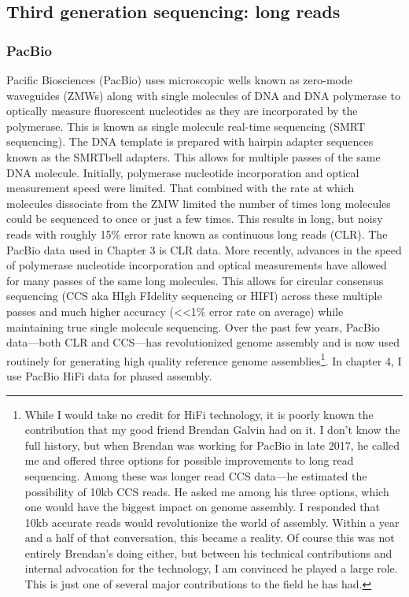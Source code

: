 \subsection{Third generation sequencing: long reads}\label{section:longreads}

\subsubsection{PacBio}

\par{
Pacific Biosciences (PacBio) uses microscopic wells known as zero-mode waveguides (ZMWs) along with single molecules of DNA and DNA polymerase to optically measure fluorescent nucleotides as they are incorporated by the polymerase. This is known as single molecule real-time sequencing (SMRT sequencing). The DNA template is prepared with hairpin adapter sequences known as the SMRTbell adapters. This allows for multiple passes of the same DNA molecule. Initially, polymerase nucleotide incorporation and optical measurement speed were limited. That combined with the rate at which molecules dissociate from the ZMW limited the number of times long molecules could be sequenced to once or just a few times. This results in long, but noisy reads with roughly 15\% error rate\cite{pacbio}\cite{blasr}\cite{clrerror} known as continuous long reads (CLR). The PacBio data used in Chapter 3 is CLR data. More recently, advances in the speed of polymerase nucleotide incorporation and optical measurements have allowed for many passes of the same long molecules. This allows for circular consensus sequencing (CCS aka HIgh FIdelity sequencing or HIFI) across these multiple passes and much higher accuracy (<<1\% error rate on average) while maintaining true single molecule sequencing\cite{HIFI}. Over the past few years, PacBio data---both CLR and CCS---has revolutionized genome assembly and is now used routinely for generating high quality reference genome assemblies\footnote{While I would take no credit for HiFi technology, it is poorly known the contribution that my good friend Brendan Galvin had on it. I don't know the full history, but when Brendan was working for PacBio in late 2017, he called me and offered three options for possible improvements to long read sequencing. Among these was longer read CCS data---he estimated the possibility of 10kb CCS reads. He asked me among his three options, which one would have the biggest impact on genome assembly. I responded that 10kb accurate reads would revolutionize the world of assembly. Within a year and a half of that conversation, this became a reality. Of course this was not entirely Brendan's doing either, but between his technical contributions and internal advocation for the technology, I am convinced he played a large role. This is just one of several major contributions to the field he has had.}. In chapter 4, I use PacBio HiFi data for phased assembly.
}

